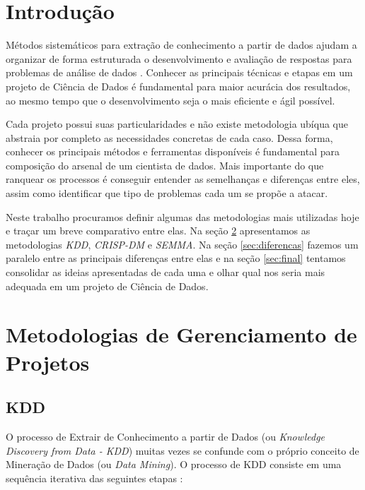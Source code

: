 \documentclass[
	article,			%
	11pt,				%
	oneside,			%
	a4paper,			%
	english,			%
	brazil,				%
	sumario=tradicional
	]{abntex2}
\begin{document}
\section{Introdução}

Métodos sistemáticos para extração de conhecimento a partir de dados ajudam a
organizar de forma estruturada o desenvolvimento e avaliação de respostas para
problemas de análise de dados \cite{provost2013}. Conhecer as principais
técnicas e etapas em um projeto de Ciência de Dados é fundamental para maior
acurácia dos resultados, ao mesmo tempo que o desenvolvimento seja o mais
eficiente e ágil possível.

Cada projeto possui suas particularidades e não existe metodologia ubíqua que
abstraia por completo as necessidades concretas de cada caso. Dessa forma,
conhecer os principais métodos e ferramentas disponíveis é fundamental para
composição do arsenal de um cientista de dados. Mais importante do que ranquear
os processos é conseguir entender as semelhanças e diferenças entre eles, assim
como identificar que tipo de problemas cada um se propõe a atacar.

Neste trabalho procuramos definir algumas das metodologias mais utilizadas hoje
e traçar um breve comparativo entre elas. Na seção \ref{sec:metodologias}
apresentamos as metodologias \textit{KDD}, \textit{CRISP-DM} e \textit{SEMMA}.
Na seção \ref{sec:diferencas} fazemos um paralelo entre as principais diferenças
entre elas e na seção \ref{sec:final} tentamos consolidar as ideias apresentadas
de cada uma e olhar qual nos seria mais adequada em um projeto de Ciência de
Dados.

\section{Metodologias de Gerenciamento de Projetos}
\label{sec:metodologias}

\subsection{KDD}

O processo de Extrair de Conhecimento a partir de Dados (ou
\textit{Knowledge Discovery from Data - KDD}) muitas vezes se confunde com o
próprio conceito de Mineração de Dados (ou \textit{Data Mining}). O processo de
KDD consiste em uma sequência iterativa das seguintes etapas \cite{han2006}:
\end{document}
